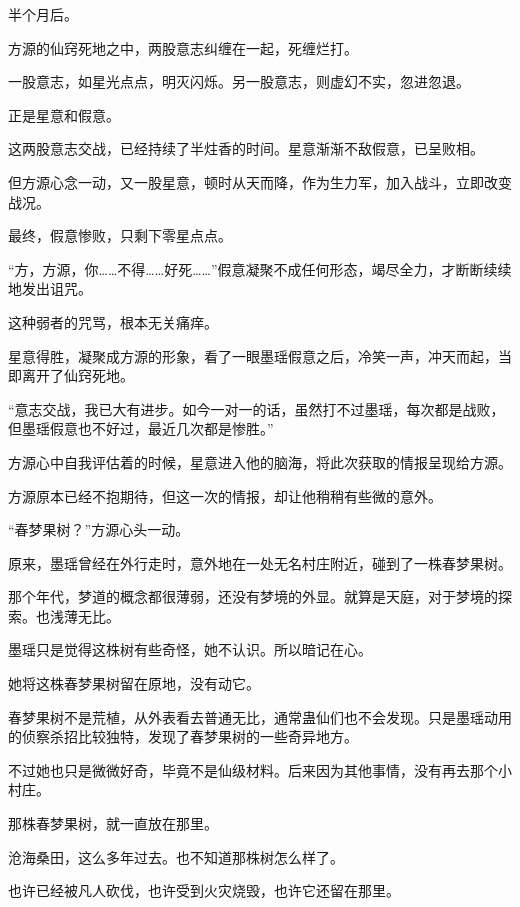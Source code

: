 
\begin{this_body}



半个月后。

方源的仙窍死地之中，两股意志纠缠在一起，死缠烂打。

一股意志，如星光点点，明灭闪烁。另一股意志，则虚幻不实，忽进忽退。

正是星意和假意。

这两股意志交战，已经持续了半炷香的时间。星意渐渐不敌假意，已呈败相。

但方源心念一动，又一股星意，顿时从天而降，作为生力军，加入战斗，立即改变战况。

最终，假意惨败，只剩下零星点点。

“方，方源，你……不得……好死……”假意凝聚不成任何形态，竭尽全力，才断断续续地发出诅咒。

这种弱者的咒骂，根本无关痛痒。

星意得胜，凝聚成方源的形象，看了一眼墨瑶假意之后，冷笑一声，冲天而起，当即离开了仙窍死地。

“意志交战，我已大有进步。如今一对一的话，虽然打不过墨瑶，每次都是战败，但墨瑶假意也不好过，最近几次都是惨胜。”

方源心中自我评估着的时候，星意进入他的脑海，将此次获取的情报呈现给方源。

方源原本已经不抱期待，但这一次的情报，却让他稍稍有些微的意外。

“春梦果树？”方源心头一动。

原来，墨瑶曾经在外行走时，意外地在一处无名村庄附近，碰到了一株春梦果树。

那个年代，梦道的概念都很薄弱，还没有梦境的外显。就算是天庭，对于梦境的探索。也浅薄无比。

墨瑶只是觉得这株树有些奇怪，她不认识。所以暗记在心。

她将这株春梦果树留在原地，没有动它。

春梦果树不是荒植，从外表看去普通无比，通常蛊仙们也不会发现。只是墨瑶动用的侦察杀招比较独特，发现了春梦果树的一些奇异地方。

不过她也只是微微好奇，毕竟不是仙级材料。后来因为其他事情，没有再去那个小村庄。

那株春梦果树，就一直放在那里。

沧海桑田，这么多年过去。也不知道那株树怎么样了。

也许已经被凡人砍伐，也许受到火灾烧毁，也许它还留在那里。


\end{this_body}
